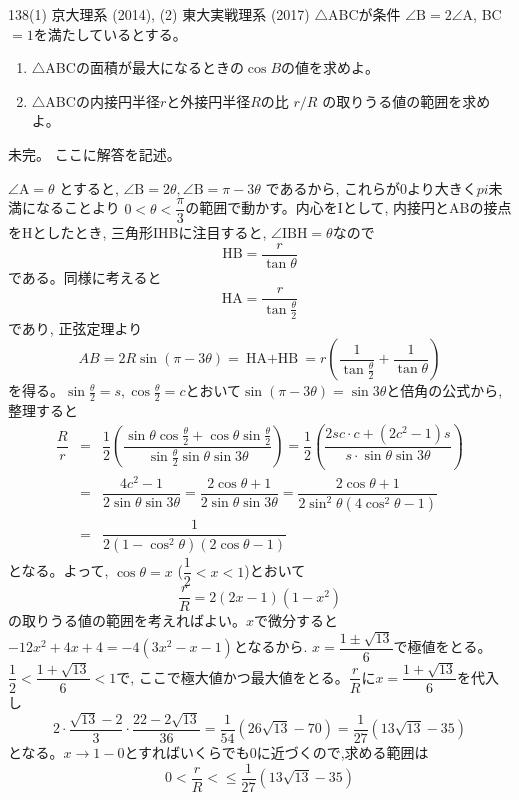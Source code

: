\begin{prob}{138}{}{(1) 京大理系 (2014), (2) 東大実戦理系 (2017)}
 $\triangle$ABCが条件 $\angle{\mbox{B}}=2\angle{\mbox{A}}$, BC$=1$を満たしているとする。
 \begin{enumerate}
  \item $\triangle$ABCの面積が最大になるときの$\cos{B}$の値を求めよ。
  \item $\triangle$ABCの内接円半径$r$と外接円半径$R$の比 $r/R$ の取りうる値の範囲を求めよ。
 \end{enumerate}
\end{prob}
未完。
ここに解答を記述。

$\angle{\mbox{A}}=\theta$ とすると, $\angle{\mbox{B}}=2\theta, 　\angle{\mbox{B}}=\pi-3\theta$ であるから, これらが0より大きく$pi$未満になることより $0<\theta<\dfrac{\pi}{3}$の範囲で動かす。内心をIとして, 内接円とABの接点をHとしたとき, 三角形IHBに注目すると, $\angle{\mbox{IBH}}=\theta$なので
\[\mbox{HB}=\dfrac{r}{\tan{\theta}}\]
である。同様に考えると
\[\mbox{HA}=\dfrac{r}{\tan{\frac{\theta}{2}}}\]
であり, 正弦定理より
\[AB=2R\sin{ (\pi-3\theta) } =\mbox{HA$+$HB} =r\left( \dfrac{1}{ \tan{\frac{\theta}{2} }}+\dfrac{1}{\tan{\theta}}\right)\]
を得る。$\sin{\frac{\theta}{2}}=s, \cos{\frac{\theta}{2}}=c$とおいて$\sin{(\pi-3\theta)=\sin{3\theta}}$と倍角の公式から,整理すると
\begin{eqnarray*}
\dfrac{R}{r}&=&\dfrac{1}{2}\left( \dfrac{\sin{\theta}\cos{\frac{\theta}{2}}  +\cos{\theta}\sin{ \frac{\theta}{2} }  }{\sin{\frac{\theta}{2}}\sin{\theta}\sin{3\theta}}\right)=\dfrac{1}{2}\left( \dfrac{2sc\cdot c + (2c^2-1)s}{s\cdot \sin{\theta} \sin{3\theta}}\right)\\
&=&\dfrac{4c^2-1}{2\sin{\theta}\sin{3\theta}} = \dfrac{2\cos{\theta}+1}{2\sin{\theta}\sin{3\theta}}=\dfrac{2\cos{\theta}+1}{2\sin^2{\theta}(4\cos^2{\theta}-1)}\\
&=&\dfrac{1}{2(1-\cos^2{\theta})(2\cos{\theta}-1)}
\end{eqnarray*}
となる。よって, $\cos{\theta}=x$ ($\dfrac{1}{2}<x<1$)とおいて
\[\dfrac{r}{R}=2(2x-1)(1-x^2)\]
の取りうる値の範囲を考えればよい。$x$で微分すると $-12x^2+4x+4=-4(3x^2-x-1)$となるから. $x=\dfrac{1\pm \sqrt{13}}{6}$で極値をとる。$\dfrac{1}{2}<\dfrac{1+\sqrt{13}}{6}<1$で, ここで極大値かつ最大値をとる。$\dfrac{r}{R}$に$x=\dfrac{1+\sqrt{13}}{6}$を代入し
\[2\cdot\dfrac{\sqrt{13}-2}{3}\cdot\dfrac{22-2\sqrt{13}}{36} = \dfrac{1}{54}(26\sqrt{13} -70)=\dfrac{1}{27}(13\sqrt{13}-35)\]
となる。$x\to 1-0$とすればいくらでも0に近づくので,求める範囲は
\[0<\dfrac{r}{R}<\leq \dfrac{1}{27}(13\sqrt{13}-35)\]
